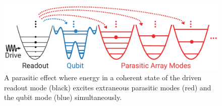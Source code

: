\documentclass[%
reprint,
superscriptaddress,
 amsmath,amssymb,
 aps,
 prx,
longbibliography,
floatfix,
]{revtex4-2}
\begin{document}


\begin{figure}
    \centering
    \includegraphics[width=\linewidth]{Figures/Demo.pdf}
    \caption{A parasitic effect where energy in a coherent state of the driven readout mode (black) excites extraneous parasitic modes (red) and the qubit mode (blue) simultaneously. %
    }
    \label{fig:demo}
\end{figure}
\end{document}

